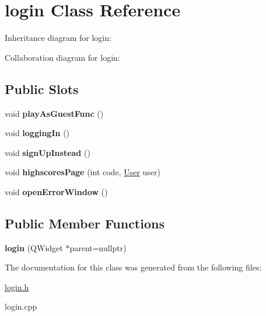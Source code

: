 \hypertarget{classlogin}{}\section{login Class Reference}
\label{classlogin}


Inheritance diagram for login\+:


Collaboration diagram for login\+:
\subsection*{Public Slots}
\begin{DoxyCompactItemize}
\item 
\mbox{\label{classlogin_a3943e040ffdca1506e7b204f13e89648}} 
void {\bfseries play\+As\+Guest\+Func} ()
\item 
\mbox{\label{classlogin_af0f652b5cde090b78044643600825005}} 
void {\bfseries logging\+In} ()
\item 
\mbox{\label{classlogin_aed1f3711cf9706e49350da07c40d2b40}} 
void {\bfseries sign\+Up\+Instead} ()
\item 
\mbox{\label{classlogin_ac0405ea1c1bbaeb802efb5502dba2ca1}} 
void {\bfseries highscores\+Page} (int code, \hyperlink{classUser}{User} user)
\item 
\mbox{\label{classlogin_aaf2213b1365bc955309116f73e65ce6c}} 
void {\bfseries open\+Error\+Window} ()
\end{DoxyCompactItemize}
\subsection*{Public Member Functions}
\begin{DoxyCompactItemize}
\item 
\mbox{\label{classlogin_ab0ef02ae84a8c877a3da00c9bb600d44}} 
{\bfseries login} (Q\+Widget $\ast$parent=nullptr)
\end{DoxyCompactItemize}


The documentation for this class was generated from the following files\+:\begin{DoxyCompactItemize}
\item 
\hyperlink{login_8h}{login.\+h}\item 
login.\+cpp\end{DoxyCompactItemize}
